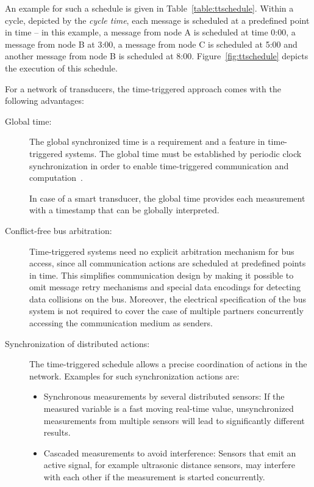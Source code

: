 \documentclass[11pt,a4paper,]{article}
\begin{document}
An example for such a schedule is given in
Table~\ref{table:ttschedule}. Within a cycle, depicted by the {\em
cycle time}, each message is scheduled at a predefined point in
time -- in this example, a message from node A is scheduled at
time 0:00, a message from node B at 3:00, a message from node C is
scheduled at 5:00 and another message from node B is scheduled at
8:00. Figure~\ref{fig:ttschedule} depicts the execution of this
schedule.


For a network of transducers, the time-triggered approach comes
with the following advantages:

\begin{description}

\item[Global time:] The global synchronized time is a requirement
and a feature in time-triggered systems. The global time must be
established by periodic clock synchronization in order to enable
time-triggered communication and
computation~\cite[p.\,52]{kopetz:97}.

In case of a smart transducer, the global time provides each
measurement with a timestamp that can be globally interpreted.

\item[Conflict-free bus arbitration:] Time-triggered systems need
no explicit arbitration mechanism for bus access, since all
communication actions are scheduled at predefined points in time.
This simplifies communication design by making it possible to omit
message retry mechanisms and special data encodings for detecting
data collisions on the bus. Moreover, the electrical specification
of the bus system is not required to cover the case of multiple
partners concurrently accessing the communication medium as
senders.\cite[p.\,176]{kopetz:97}

\item[Synchronization of distributed actions:] The time-triggered
schedule allows a precise coordination of actions in the network.
Examples for such synchronization actions are:

\begin{itemize}

\item Synchronous measurements by several distributed sensors: If
the measured variable is a fast moving real-time value,
unsynchronized measurements from multiple sensors will lead to
significantly different results.

\item Cascaded measurements to avoid interference: Sensors that
emit an active signal, for example ultrasonic distance sensors,
may interfere with each other if the measurement is started
concurrently.


\end{itemize}
\end{description}
\end{document}
